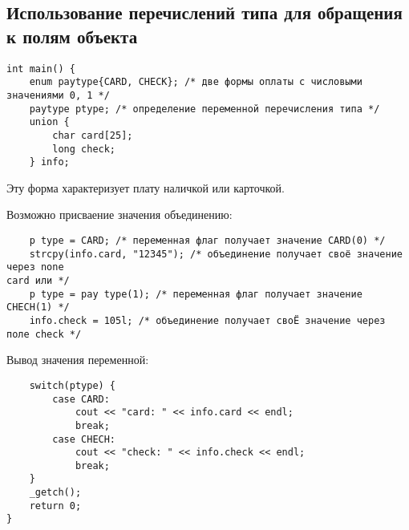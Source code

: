 \subsection{Использование перечислений типа для обращения к полям объекта}

\begin{verbatim}
int main() {
    enum paytype{CARD, CHECK}; /* две формы оплаты с числовыми значениями 0, 1 */
    paytype ptype; /* определение переменной перечисления типа */
    union {
        char card[25];
        long check;
    } info;
\end{verbatim}

Эту форма характеризует плату наличкой или карточкой.

Возможно присваение значения объединению:

\begin{verbatim}
    p type = CARD; /* переменная флаг получает значение CARD(0) */
    strcpy(info.card, "12345"); /* объединение получает своё значение через none
card или */
    p type = pay type(1); /* переменная флаг получает значение CHECH(1) */
    info.check = 105l; /* объединение получает своЁ значение через поле check */
\end{verbatim}

Вывод значения переменной:

\begin{verbatim}
    switch(ptype) {
        case CARD:
            cout << "card: " << info.card << endl;
            break;
        case CHECH:
            cout << "check: " << info.check << endl;
            break;
    }
    _getch();
    return 0;
}
\end{verbatim}